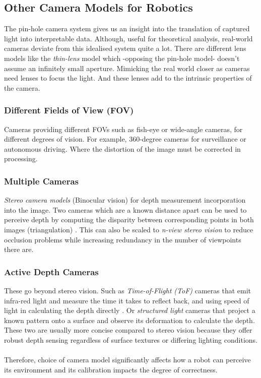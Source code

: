 \subsection{Other Camera Models for Robotics}
The pin-hole camera system gives us an insight into the translation of captured light into interpretable data. Although, useful for theoretical analysis, real-world cameras deviate from this idealised system quite a lot.
There are different lens models like the \emph{thin-lens} model which -opposing the pin-hole model- doesn't assume an infinitely small aperture. Mimicking the real world closer as cameras need lenses to focus the light. And these lenses add to the intrinsic properties of the camera.

\subsubsection{Different Fields of View (FOV)}
Cameras providing different FOVs such as fish-eye or wide-angle cameras, for different degrees of vision. For example, 360-degree cameras for surveillance or autonomous driving. Where the distortion of the image must be corrected in processing.

\subsubsection{Multiple Cameras}
\emph{Stereo camera models} (Binocular vision) for depth measurement incorporation into the image. Two cameras which are a known distance apart can be used to perceive depth by computing the disparity between corresponding points in both images (triangulation) \cite{hamzah2016literature}. This can also be scaled to \emph{n-view stereo vision} to reduce occlusion problems while increasing redundancy in the number of viewpoints there are.
\label{subsubsec:nview}

\subsubsection{Active Depth Cameras}
These go beyond stereo vision. Such as \emph{Time-of-Flight (ToF)} cameras that emit infra-red light and measure the time it takes to reflect back, and using speed of light in calculating the depth directly \cite{foix2011tof,zanuttigh2016time}. Or \emph{structured light} cameras that project a known pattern onto a surface and observe its deformation to calculate the depth. These two are usually more concise compared to stereo vision because they offer robust depth sensing regardless of surface textures or differing lighting conditions.
\\\\
Therefore, choice of camera model significantly affects how a robot can perceive its environment and its calibration impacts the degree of correctness.

